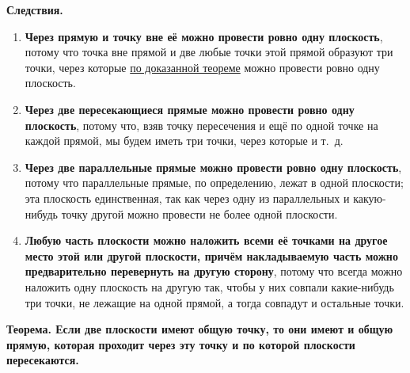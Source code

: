  \textbf{Следствия.}

\begin{enumerate}[label=\arabic*),ref=\arabic*]
    \item\label{item:plane-through-line-and-point} \textbf{Через прямую и точку вне её можно провести ровно одну плоскость}, потому что точка вне прямой и две любые точки этой прямой образуют три точки, через которые \hyperref[para:plane-through-three-points]{по доказанной теореме} можно провести ровно одну плоскость.
    \item\label{item:plane-through-intersecting-lines} \textbf{Через две пересекающиеся прямые можно провести ровно одну плоскость}, потому что, взяв точку пересечения и ещё по одной точке на каждой прямой, мы будем иметь три точки, через которые и т.~д.
    \item \textbf{Через две параллельные прямые можно провести ровно одну плоскость}, потому что параллельные прямые, по определению, лежат в одной плоскости; эта плоскость единственная, так как через одну из параллельных и какую-нибудь точку другой можно провести не более одной плоскости.
    \item \textbf{Любую часть плоскости можно наложить всеми её точками на другое место этой или другой плоскости, причём накладываемую часть можно предварительно перевернуть на другую сторону}, потому что всегда можно наложить одну плоскость на другую так, чтобы у них совпали какие-нибудь три точки, не лежащие на одной прямой, а тогда совпадут и остальные точки.
\end{enumerate}

 \textbf{Теорема. Если две плоскости имеют общую точку, то они имеют и общую прямую, которая проходит через эту точку и по которой плоскости пересекаются.}

